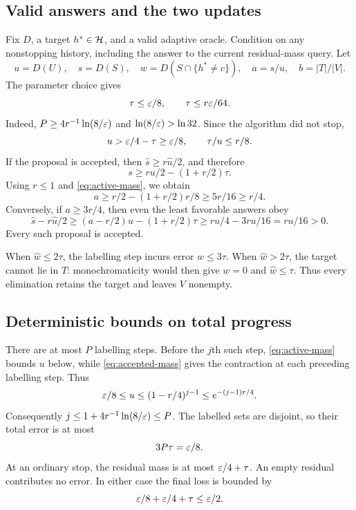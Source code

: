 \subsection{Valid answers and the two updates}
Fix $D$, a target $h^*\in\mathcal H$, and a valid adaptive oracle. Condition on any nonstopping history, including the answer to the current residual-mass query. Let
\[
 u=D(U),\quad s=D(S),\quad
 w=D(S\cap\{h^*\ne c\}),\quad
 a=s/u,\quad b=|T|/|V|.
\]
The parameter choice gives
\begin{equation}
 \tau\le\varepsilon/8,\qquad \tau\le r\varepsilon/64.
\label{eq:tau-small}
\end{equation}
Indeed, $P\ge4r^{-1}\ln(8/\varepsilon)$ and $\ln(8/\varepsilon)>\ln32$. Since the algorithm did not stop,
\begin{equation}
 u>\varepsilon/4-\tau\ge\varepsilon/8,
 \qquad \tau/u\le r/8.
\label{eq:active-mass}
\end{equation}
If the proposal is accepted, then $\hat s\ge r\hat u/2$, and therefore
\[
 s\ge ru/2-(1+r/2)\tau.
\]
Using $r\le1$ and \eqref{eq:active-mass}, we obtain
\begin{equation}
 a\ge r/2-(1+r/2)r/8\ge5r/16\ge r/4.
\label{eq:accepted-mass}
\end{equation}
Conversely, if $a\ge3r/4$, then even the least favorable answers obey
\[
 \hat s-r\hat u/2
 \ge (a-r/2)u-(1+r/2)\tau
 \ge ru/4-3ru/16=ru/16>0.
\]
Every such proposal is accepted.

When $\hat w\le2\tau$, the labelling step incurs error $w\le3\tau$. When $\hat w>2\tau$, the target cannot lie in $T$: monochromaticity would then give $w=0$ and $\hat w\le\tau$. Thus every elimination retains the target and leaves $V$ nonempty.

\subsection{Deterministic bounds on total progress}
There are at most $P$ labelling steps. Before the $j$th such step, \eqref{eq:active-mass} bounds $u$ below, while \eqref{eq:accepted-mass} gives the contraction at each preceding labelling step. Thus
\[
 \varepsilon/8\le u\le(1-r/4)^{j-1}\le e^{-(j-1)r/4}.
\]
Consequently $j\le1+4r^{-1}\ln(8/\varepsilon)\le P$. The labelled sets are disjoint, so their total error is at most
\begin{equation}
 3P\tau=\varepsilon/8.
\label{eq:peel-error}
\end{equation}
At an ordinary stop, the residual mass is at most $\varepsilon/4+\tau$. An empty residual contributes no error. In either case the final loss is bounded by
\begin{equation}
 \varepsilon/8+\varepsilon/4+\tau\le\varepsilon/2.
\label{eq:normal-loss}
\end{equation}

